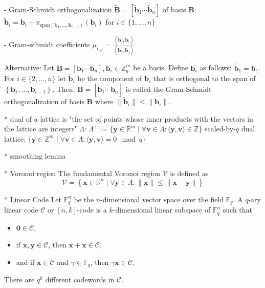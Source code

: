 \documentclass[
  a4paper,  %
  twoside,  %
  bibliography=totoc,
  headsepline,
  cleardoublepage=empty,
  parskip=half,
  draft=false
]{scrbook}
\begin{document}
    - Gram-Schmidt orthogonalization $\tilde{\mathbf{B}} = \left[\tilde{\mathbf{b}}_1 \cdots \tilde{\mathbf{b}}_n\right]$ of basis $\mathbf{B}$: $\tilde{\mathbf{b}}_i = \mathbf{b}_i - \pi_{\text{span}(\mathbf{b}_1, \ldots, \mathbf{b}_{i-1})}(\mathbf{b}_i)$ for $i \in \{1, \ldots, n\}$ 

    - Gram-schmidt coefficients $\mu_{i, j} = \frac{\left\langle \tilde{\mathbf{b}}_j, \mathbf{b}_i\right\rangle}{\left\langle \tilde{\mathbf{b}}_j, \tilde{\mathbf{b}}_j\right\rangle}$ %

    Alternative:
    Let $\mathbf{B} = \left[\mathbf{b}_1 \cdots \mathbf{b}_n\right], \mathbf{b}_i \in \mathbb{Z}_q^{m}$ be a basis. Define $\tilde{\mathbf{b}}_i$ as follows: $\tilde{\mathbf{b}}_1 = \mathbf{b}_1$. For $i \in \{2, \ldots, n\}$ let $\tilde{\mathbf{b}}_i$ be the component of $\mathbf{b}_i$ that is orthogonal to the span of $\left\{\mathbf{b}_1, \ldots, \mathbf{b}_{i-1}\right\}$. Then,  $\tilde{\mathbf{B}} = \left[\tilde{\mathbf{b}}_1 \cdots \tilde{\mathbf{b}}_n\right]$ is called the Gram-Schmidt orthogonalization of basis $\mathbf{B}$ where $\| \tilde{\mathbf{b}}_i\| \leq \| \mathbf{b}_i\|$. 

  
  * dual of a lattice is "the set of points whose inner products with the vectors in the lattice are integers" $\Lambda$: $\Lambda^{\perp} := \{ \mathbf{y} \in \mathbb{R}^m \mid \forall \mathbf{v} \in \Lambda: \langle \mathbf{y}, \mathbf{v} \rangle \in \mathbb{Z}\}$
    scaled-by-$q$ dual lattice:  $\{ \mathbf{y} \in \mathbb{Z}^m \mid \forall \mathbf{v} \in \Lambda: \langle \mathbf{y}, \mathbf{v} \rangle = 0 \mod q\}$ %
    
  * smoothing lemma

  * Voronoi region %
  The fundamental Voronoi region $\mathcal{V}$ is defined as 
  \begin{equation}
    \mathcal{V} = \left\{ \mathbf{x} \in \mathbb{R}^n \mid \forall \mathbf{y} \in \Lambda : \| \mathbf{x} \| \leq \| \mathbf{x} - \mathbf{y} \| \right\}
  \end{equation}

  * Linear Code \cite{VanLint12} %
    Let $\mathbb{F}_q^n$ be the $n$-dimensional vector space over the field $\mathbb{F}_q$. A $q$-ary linear code $\mathcal{C}$ or $[n, k]$-code is a $k$-dimensional linear subspace of $\mathbb{F}_q^n$ such that 
    \begin{itemize}
      \item $\mathbf{0} \in \mathcal{C}$,
      \item if $\mathbf{x}, \mathbf{y} \in \mathcal{C}$, then $\mathbf{x} + \mathbf{x} \in \mathcal{C}$,
      \item and if $\mathbf{x} \in \mathcal{C}$ and $\gamma \in \mathbb{F}_q$, then $\gamma \mathbf{x} \in \mathcal{C}$.
    \end{itemize}
    There are $q^k$ different codewords in $\mathcal{C}$.
\end{document}
